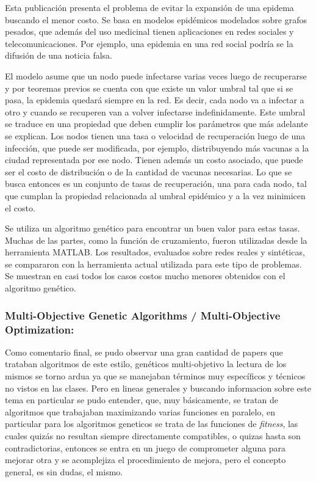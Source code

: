 Esta publicación presenta el problema de evitar la expansión de una epidema buscando el menor costo. Se basa en modelos
 epidémicos modelados sobre grafos pesados, que además del uso medicinal tienen aplicaciones en redes sociales y
 telecomunicaciones. Por ejemplo, una epidemia en una red social podría se la difusión de una noticia falsa.


El modelo asume que un nodo puede infectarse varias veces luego de recuperarse y por teoremas previos se cuenta con
que existe un valor umbral tal que si se pasa, la epidemia quedará siempre en la red. Es decir, cada nodo va a infectar
 a otro y cuando se recuperen van a volver infectarse indefinidamente. Este umbral se traduce en una propiedad que
 deben cumplir los parámetros que más adelante se explican.
Los nodos tienen una tasa o velocidad de recuperación luego de una infección, que puede ser modificada, por ejemplo,
distribuyendo más vacunas a la ciudad representada por ese nodo. Tienen además un costo asociado, que puede ser el costo
 de distribución o de la cantidad de vacunas necesarias. Lo que se busca entonces es un conjunto de tasas de recuperación,
 una para cada nodo, tal que cumplan la propiedad relacionada al umbral epidémico y a la vez minimicen el costo.


Se utiliza un algoritmo genético para encontrar un buen valor para estas tasas. Muchas de las partes, como la función de
cruzamiento, fueron utilizadas desde la herramienta MATLAB.
Los resultados, evaluados sobre redes reales y sintéticas, se compararon con la herramienta actual utilizada para este
tipo de problemas. Se muestran en casi todos los casos costos mucho menores obtenidos con el algoritmo genético.

\subsubsection*{Multi-Objective Genetic Algorithms / Multi-Objective Optimization:}

Como comentario final, se pudo observar una gran cantidad de papers que trataban algoritmos de este estilo, genéticos
multi-objetivo la lectura de los mismos se torno ardua ya que se manejaban términos muy específicos y técnicos no vistos
en las clases. Pero en lineas generales y buscando informacion\cite{MOO} sobre este tema en particular se pudo entender,
que, muy básicamente, se tratan de algoritmos que trabajaban maximizando varias funciones en paralelo, en particular
para los algoritmos geneticos se trata de las funciones de \emph{fitness}, las cuales quizás no resultan siempre
directamente compatibles, o quizas hasta son contradictorias, entonces se entra en un juego de comprometer alguna
para mejorar otra y se acomplejiza el procedimiento de mejora, pero el concepto general, es sin dudas, el mismo.
